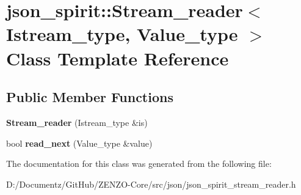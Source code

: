 \hypertarget{classjson__spirit_1_1_stream__reader}{}\section{json\+\_\+spirit\+::Stream\+\_\+reader$<$ Istream\+\_\+type, Value\+\_\+type $>$ Class Template Reference}
\label{classjson__spirit_1_1_stream__reader}
\subsection*{Public Member Functions}
\begin{DoxyCompactItemize}
\item 
\mbox{\label{classjson__spirit_1_1_stream__reader_a8aca8be9215894693176cd89f2d10091}} 
{\bfseries Stream\+\_\+reader} (Istream\+\_\+type \&is)
\item 
\mbox{\label{classjson__spirit_1_1_stream__reader_acd723ec164d87c00088b60bd364a606d}} 
bool {\bfseries read\+\_\+next} (Value\+\_\+type \&value)
\end{DoxyCompactItemize}


The documentation for this class was generated from the following file\+:\begin{DoxyCompactItemize}
\item 
D\+:/\+Documentz/\+Git\+Hub/\+Z\+E\+N\+Z\+O-\/\+Core/src/json/json\+\_\+spirit\+\_\+stream\+\_\+reader.\+h\end{DoxyCompactItemize}
